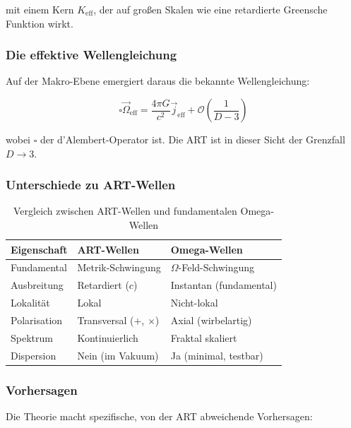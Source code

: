 \documentclass[12pt,a4paper]{article}
\begin{document}
mit einem Kern $K_{\text{eff}}$, der auf großen Skalen wie eine retardierte Greensche Funktion wirkt.

\subsubsection{Die effektive Wellengleichung}

Auf der Makro-Ebene emergiert daraus die bekannte Wellengleichung:

\begin{equation}
\square \vec{\Omega}_{\text{eff}} = \frac{4\pi G}{c^2} \vec{j}_{\text{eff}} + \mathcal{O} \left( \frac{1}{D-3} \right)
\end{equation}

wobei $\square$ der d'Alembert-Operator ist. Die ART ist in dieser Sicht der Grenzfall $D \rightarrow 3$.

\subsubsection{Unterschiede zu ART-Wellen}

\begin{table}[ht]
\centering
\caption{Vergleich zwischen ART-Wellen und fundamentalen Omega-Wellen}
\begin{tabular}{p{4cm}p{4cm}p{4cm}}
\toprule
Eigenschaft & ART-Wellen & Omega-Wellen \\
\midrule
Fundamental & Metrik-Schwingung & $\Omega$-Feld-Schwingung \\
Ausbreitung & Retardiert ($c$) & Instantan (fundamental) \\
Lokalität & Lokal & Nicht-lokal \\
Polarisation & Transversal ($+$, $\times$) & Axial (wirbelartig) \\
Spektrum & Kontinuierlich & Fraktal skaliert \\
Dispersion & Nein (im Vakuum) & Ja (minimal, testbar) \\
\bottomrule
\end{tabular}
\end{table}

\subsubsection{Vorhersagen}

Die Theorie macht spezifische, von der ART abweichende Vorhersagen:
\end{document}
